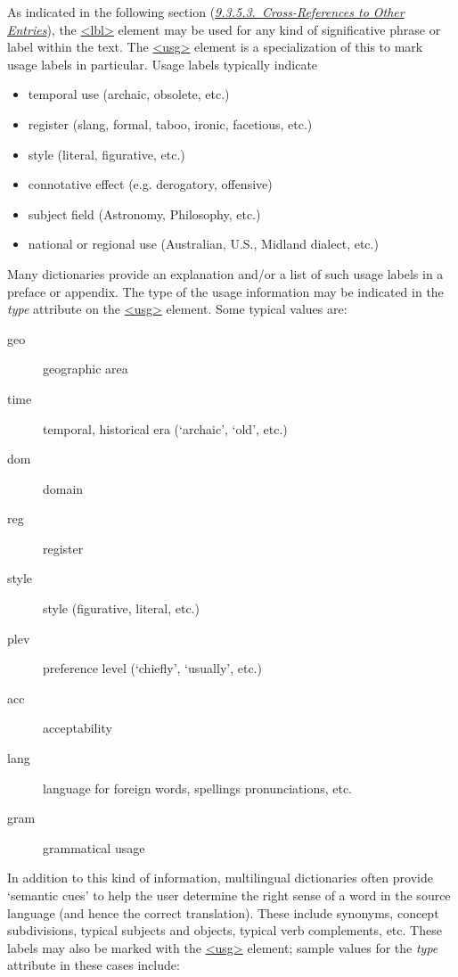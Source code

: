  As indicated in the following section (\textit{\hyperref[DITPXR]{9.3.5.3.\ Cross-References to Other Entries}}), the \hyperref[TEI.lbl]{<lbl>} element may be used for any kind of significative phrase or label within the text. The \hyperref[TEI.usg]{<usg>} element is a specialization of this to mark usage labels in particular. Usage labels typically indicate \begin{itemize}
\item temporal use (archaic, obsolete, etc.)
\item register (slang, formal, taboo, ironic, facetious, etc.)
\item style (literal, figurative, etc.)
\item connotative effect (e.g. derogatory, offensive)
\item subject field (Astronomy, Philosophy, etc.)
\item national or regional use (Australian, U.S., Midland dialect, etc.)
\end{itemize}  Many dictionaries provide an explanation and/or a list of such usage labels in a preface or appendix. The type of the usage information may be indicated in the {\itshape type} attribute on the \hyperref[TEI.usg]{<usg>} element. Some typical values are:\begin{description}

\item[{geo}]geographic area
\item[{time}]temporal, historical era (‘archaic’, ‘old’, etc.)
\item[{dom}]domain
\item[{reg}]register
\item[{style}]style (figurative, literal, etc.)
\item[{plev}]preference level (‘chiefly’, ‘usually’, etc.)
\item[{acc}]acceptability
\item[{lang}]language for foreign words, spellings pronunciations, etc.
\item[{gram}]grammatical usage
\end{description}  In addition to this kind of information, multilingual dictionaries often provide ‘semantic cues’ to help the user determine the right sense of a word in the source language (and hence the correct translation). These include synonyms, concept subdivisions, typical subjects and objects, typical verb complements, etc. These labels may also be marked with the \hyperref[TEI.usg]{<usg>} element; sample values for the {\itshape type} attribute in these cases include:\begin{description}


\end{description}
